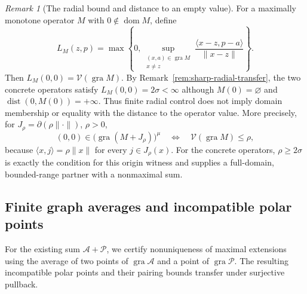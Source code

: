 \documentclass[11pt]{article}
\newcommand{\gra}{\operatorname{gra}}
\newcommand{\dom}{\operatorname{dom}}
\newcommand{\pair}[2]{\langle #1,#2\rangle}
\theoremstyle{definition}
\theoremstyle{remark}
\newtheorem{remark}{Remark}
\newcommand{\dist}{\operatorname{dist}}
\begin{document}
\begin{remark}[The radial bound and distance to an empty value]
\label{rem:radial-distance-recovered}
For a maximally monotone operator $M$ with $0\notin\dom M$, define
\[
L_M(z,p)=\max\left\{0,\sup_{\substack{(x,a)\in\gra M\\x\ne z}}\frac{\pair{x-z}{p-a}}{\|x-z\|}\right\}.
\]
Then $L_M(0,0)=\mathcal V(\gra M)$. By Remark~\ref{rem:sharp-radial-transfer}, the two concrete operators satisfy $L_M(0,0)=2\sigma<\infty$ although $M(0)=\varnothing$ and $\dist(0,M(0))=+\infty$. Thus finite radial control does not imply domain membership or equality with the distance to the operator value. More precisely, for $J_\rho=\partial(\rho\|\cdot\|)$, $\rho>0$,
\[
(0,0)\in\bigl(\gra(M+J_\rho)\bigr)^\mu
\quad\Longleftrightarrow\quad\mathcal V(\gra M)\le\rho,
\]
because $\pair{x}{j}=\rho\|x\|$ for every $j\in J_\rho(x)$. For the concrete operators, $\rho\ge2\sigma$ is exactly the condition for this origin witness and supplies a full-domain, bounded-range partner with a nonmaximal sum.
\end{remark}

\subsection{Finite graph averages and incompatible polar points}
\label{subsec:appendix-graph-averages}

For the existing sum $\mathcal A+\mathcal P$, we certify nonuniqueness of maximal extensions using the average of two points of $\gra\mathcal A$ and a point of $\gra\mathcal P$. The resulting incompatible polar points and their pairing bounds transfer under surjective pullback.
\end{document}
